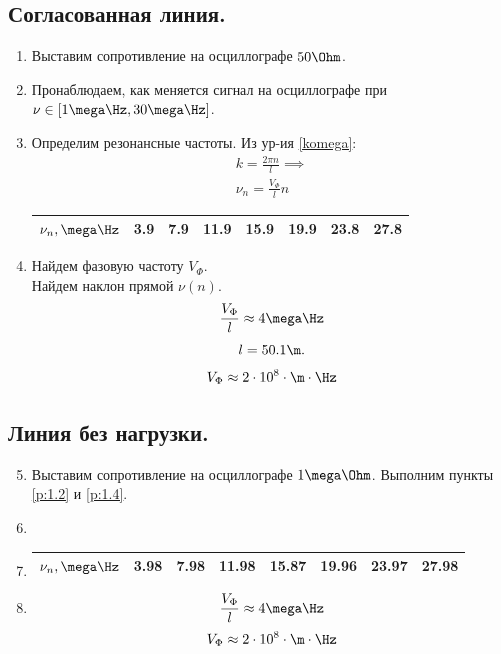 \documentclass{report}
\begin{document}
\subsection{Согласованная линия.}
\begin{enumerate}
	\item Выставим сопротивление на осциллографе $ 50 \Ohm $.
	\item \label{p:1.2} Пронаблюдаем, как меняется сигнал на осциллографе при $ \nu \in [1 \mega\Hz, 30 \mega\Hz] $.
	\item \label{p:1.3} Определим резонансные частоты.
	      Из ур-ия \ref{komega}:
	      \begin{gather}
		      k = \frac{2\pi n}{l} \implies \\
		      \nu_n = \frac{V_\Phi}{l} n
	      \end{gather}
	      \begin{table}[H]
		      \centering
		      \begin{tabular}{|l|l|l|l|l|l|l|l|}
			      \hline
			      $ \nu_n, \mega\Hz $ & 3.9 & 7.9 & 11.9 & 15.9 & 19.9 & 23.8 & 27.8 \\
			      \hline
		      \end{tabular}
	      \end{table}
	\item \label{p:1.4} Найдем фазовую частоту $ V_\Phi $.\\
	      Найдем наклон прямой $ \nu(n) $.
	      \begin{equation}
		      \frac{V_\Phi}{l} \approx 4 \mega\Hz
	      \end{equation}
	      \[
		      l = 50.1 \m
		      .\]
	      \begin{equation}
		      V_\Phi \approx 2 \cdot 10^{8} \cdot \m \cdot \Hz
	      \end{equation}
\end{enumerate}
\subsection{Линия без нагрузки.}
\begin{enumerate}
	\setcounter{enumi}{4}
	\item Выставим сопротивление на осциллографе $ 1 \mega\Ohm $.
	      Выполним пункты \ref{p:1.2} и \ref{p:1.4}.
	\item
	\item
	      \begin{table}[H]
		      \centering
		      \begin{tabular}{|l|l|l|l|l|l|l|l|}
			      \hline
			      $ \nu_n, \mega\Hz $ & 3.98 & 7.98 & 11.98 & 15.87 & 19.96 & 23.97 & 27.98 \\
			      \hline
		      \end{tabular}
	      \end{table}
	\item
	      \begin{equation}
		      \frac{V_\Phi}{l} \approx 4 \mega\Hz
	      \end{equation}
	      \begin{equation}
		      V_\Phi \approx 2 \cdot 10^{8} \cdot \m \cdot \Hz
	      \end{equation}
\end{enumerate}
\end{document}
